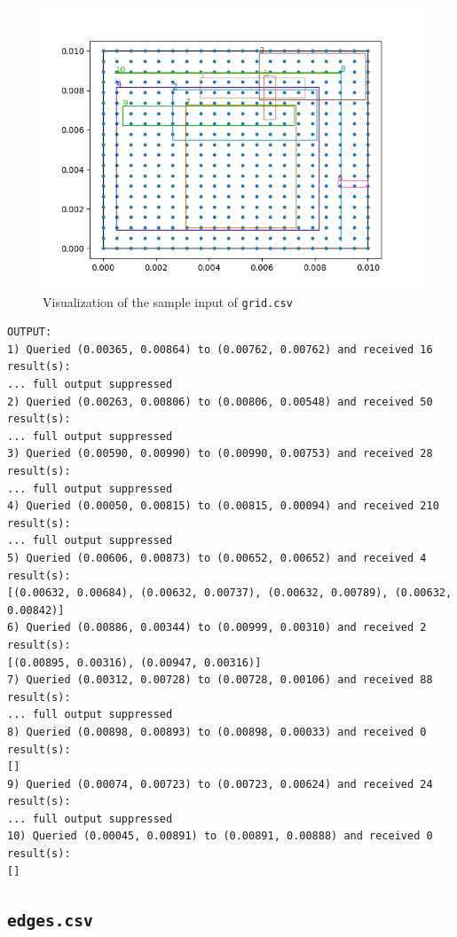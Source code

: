 \documentclass[12pt]{article}
\begin{document}
{\begin{figure}
    \centering
    \includegraphics[scale=0.8]{../img/grid.png}
    \caption{Visualization of the sample input of \texttt{grid.csv}}
    \label{fig:my_label}
\end{figure}


\begin{verbatim}
OUTPUT:
1) Queried (0.00365, 0.00864) to (0.00762, 0.00762) and received 16 result(s):
... full output suppressed
2) Queried (0.00263, 0.00806) to (0.00806, 0.00548) and received 50 result(s):
... full output suppressed
3) Queried (0.00590, 0.00990) to (0.00990, 0.00753) and received 28 result(s):
... full output suppressed
4) Queried (0.00050, 0.00815) to (0.00815, 0.00094) and received 210 result(s):
... full output suppressed
5) Queried (0.00606, 0.00873) to (0.00652, 0.00652) and received 4 result(s):
[(0.00632, 0.00684), (0.00632, 0.00737), (0.00632, 0.00789), (0.00632, 0.00842)]
6) Queried (0.00886, 0.00344) to (0.00999, 0.00310) and received 2 result(s):
[(0.00895, 0.00316), (0.00947, 0.00316)]
7) Queried (0.00312, 0.00728) to (0.00728, 0.00106) and received 88 result(s):
... full output suppressed
8) Queried (0.00898, 0.00893) to (0.00898, 0.00033) and received 0 result(s):
[]
9) Queried (0.00074, 0.00723) to (0.00723, 0.00624) and received 24 result(s):
... full output suppressed
10) Queried (0.00045, 0.00891) to (0.00891, 0.00888) and received 0 result(s):
[]
\end{verbatim}

\subsection{\texttt{edges.csv}}

}
\end{document}
